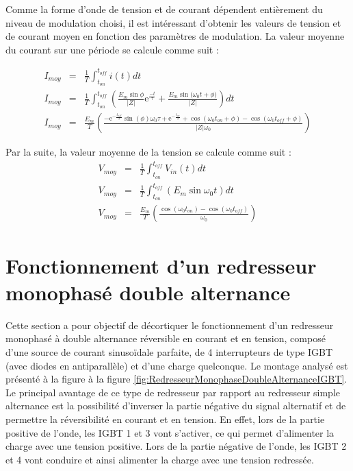 Comme la forme d'onde de tension et de courant dépendent entièrement du niveau de modulation choisi, il est intéressant d'obtenir les valeurs de tension et de courant moyen en fonction des paramètres de modulation. La valeur moyenne du courant sur une période se calcule comme suit :

\begin{eqnarray}
I_{moy} &=& \frac{1}{T}\int_{t_{on}}^{t_{off}} i(t) dt \\
I_{moy} &=& \frac{1}{T}\int_{t_{on}}^{t_{off}} \left( \frac{E_m\sin{\phi}}{|Z|}\mbox{e}^{\frac{-t}{\tau}} + \frac{E_m\sin{(\omega_0 t + \phi})}{|Z|}\right) dt \\
I_{moy} &=& \frac{E_m}{T} \left( \frac{-\mbox{e}^{-\frac{t_{off}}{\tau}}\sin{(\phi)}\omega_0 \tau + \mbox{e}^{-\frac{t_{on}}{\tau}} + \cos{(\omega_0 t_{on} + \phi)}-\cos{(\omega_0 t_{off} + \phi)}}{|Z|\omega_0} \right)
\end{eqnarray}

Par la suite, la valeur moyenne de la tension se calcule comme suit : 
\begin{eqnarray}
V_{moy} &=& \frac{1}{T}\int_{t_{on}}^{t_{off}} V_{in}(t) dt \\
V_{moy} &=& \frac{1}{T}\int_{t_{on}}^{t_{off}} (E_m \sin{\omega_0 t}) dt \\
V_{moy} &=& \frac{E_m}{T} \left( \frac{\cos{(\omega_0 t_{on})} - \cos{(\omega_0 t_{off})}}{\omega_0} \right)
\end{eqnarray}

\section{Fonctionnement d'un redresseur monophasé double alternance}
Cette section a pour objectif de décortiquer le fonctionnement d'un redresseur monophasé à double alternance réversible en courant et en tension, composé d'une source de courant sinusoïdale parfaite, de 4 interrupteurs de type IGBT (avec diodes en antiparallèle) et d'une charge quelconque. Le montage analysé est présenté à la figure à la figure \ref{fig:RedresseurMonophaseDoubleAlternanceIGBT}. Le principal avantage de ce type de redresseur par rapport au redresseur simple alternance est la possibilité d'inverser la partie négative du signal alternatif et de permettre la réversibilité en courant et en tension. En effet, lors de la partie positive de l'onde, les IGBT 1 et 3 vont s'activer, ce qui permet d'alimenter la charge avec une tension positive. Lors de la partie négative de l'onde, les IGBT 2 et 4 vont conduire et ainsi alimenter la charge avec une tension redressée. 

